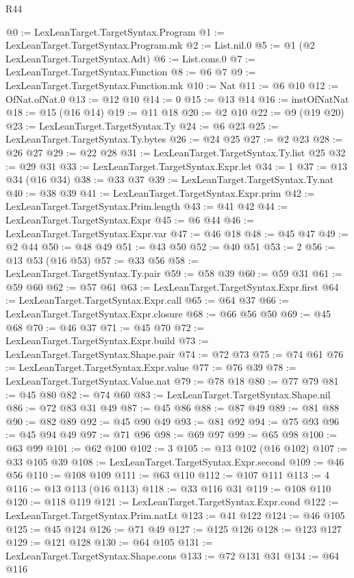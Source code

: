 \begin{lexlean}{R44}
\begin{coremodule}
@0 := LexLeanTarget.TargetSyntax.Program
@1 := LexLeanTarget.TargetSyntax.Program.mk
@2 := List.nil.{0}
@5 := @1 (@2 LexLeanTarget.TargetSyntax.Adt)
@6 := List.cons.{0}
@7 := LexLeanTarget.TargetSyntax.Function
@8 := @6 @7
@9 := LexLeanTarget.TargetSyntax.Function.mk
@10 := Nat
@11 := @6 @10
@12 := OfNat.ofNat.{0}
@13 := @12 @10
@14 := 0
@15 := @13 @14
@16 := instOfNatNat
@18 := @15 (@16 @14)
@19 := @11 @18
@20 := @2 @10
@22 := @9 (@19 @20)
@23 := LexLeanTarget.TargetSyntax.Ty
@24 := @6 @23
@25 := LexLeanTarget.TargetSyntax.Ty.bytes
@26 := @24 @25
@27 := @2 @23
@28 := @26 @27
@29 := @22 @28
@31 := LexLeanTarget.TargetSyntax.Ty.list @25
@32 := @29 @31
@33 := LexLeanTarget.TargetSyntax.Expr.let
@34 := 1
@37 := @13 @34 (@16 @34)
@38 := @33 @37
@39 := LexLeanTarget.TargetSyntax.Ty.nat
@40 := @38 @39
@41 := LexLeanTarget.TargetSyntax.Expr.prim
@42 := LexLeanTarget.TargetSyntax.Prim.length
@43 := @41 @42
@44 := LexLeanTarget.TargetSyntax.Expr
@45 := @6 @44
@46 := LexLeanTarget.TargetSyntax.Expr.var
@47 := @46 @18
@48 := @45 @47
@49 := @2 @44
@50 := @48 @49
@51 := @43 @50
@52 := @40 @51
@53 := 2
@56 := @13 @53 (@16 @53)
@57 := @33 @56
@58 := LexLeanTarget.TargetSyntax.Ty.pair
@59 := @58 @39
@60 := @59 @31
@61 := @59 @60
@62 := @57 @61
@63 := LexLeanTarget.TargetSyntax.Expr.first
@64 := LexLeanTarget.TargetSyntax.Expr.call
@65 := @64 @37
@66 := LexLeanTarget.TargetSyntax.Expr.closure
@68 := @66 @56 @50
@69 := @45 @68
@70 := @46 @37
@71 := @45 @70
@72 := LexLeanTarget.TargetSyntax.Expr.build
@73 := LexLeanTarget.TargetSyntax.Shape.pair
@74 := @72 @73
@75 := @74 @61
@76 := LexLeanTarget.TargetSyntax.Expr.value
@77 := @76 @39
@78 := LexLeanTarget.TargetSyntax.Value.nat
@79 := @78 @18
@80 := @77 @79
@81 := @45 @80
@82 := @74 @60
@83 := LexLeanTarget.TargetSyntax.Shape.nil
@86 := @72 @83 @31 @49
@87 := @45 @86
@88 := @87 @49
@89 := @81 @88
@90 := @82 @89
@92 := @45 @90 @49
@93 := @81 @92
@94 := @75 @93
@96 := @45 @94 @49
@97 := @71 @96
@98 := @69 @97
@99 := @65 @98
@100 := @63 @99
@101 := @62 @100
@102 := 3
@105 := @13 @102 (@16 @102)
@107 := @33 @105 @39
@108 := LexLeanTarget.TargetSyntax.Expr.second
@109 := @46 @56
@110 := @108 @109
@111 := @63 @110
@112 := @107 @111
@113 := 4
@116 := @13 @113 (@16 @113)
@118 := @33 @116 @31
@119 := @108 @110
@120 := @118 @119
@121 := LexLeanTarget.TargetSyntax.Expr.cond
@122 := LexLeanTarget.TargetSyntax.Prim.natLt
@123 := @41 @122
@124 := @46 @105
@125 := @45 @124
@126 := @71 @49
@127 := @125 @126
@128 := @123 @127
@129 := @121 @128
@130 := @64 @105
@131 := LexLeanTarget.TargetSyntax.Shape.cons
@133 := @72 @131 @31
@134 := @64 @116

\end{coremodule}
\end{lexlean}
